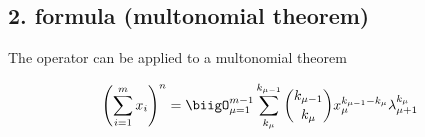 \subsection{2. formula (multonomial theorem)}

The operator can be applied to a multonomial theorem

\begin{align}
      \left( \sum_{i=1}^m x_i \right)^n = \biigO_{\mu =1
      }^{m-1}\sum_{k_\mu}^{k_{\mu-1}} \binom{k_{\mu-1}}{
      k_\mu}x_\mu^{k_{\mu-1}-k_\mu}\lambda^{k_\mu}_{\mu+1}
\end{align}
